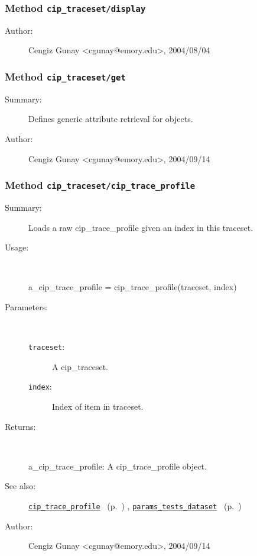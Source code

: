 \subsubsection[Method \texttt{display}]{Method \texttt{cip\_traceset/display}}%
%
\label{ref_cip_traceset__display}%
\hypertarget{ref_cip_traceset__display}{}%
\begin{description}
%
%
%
%
%
%
%
\item[Author:]%
Cengiz Gunay <cgunay@emory.edu>, 2004/08/04%
\end{description}
\methodline%
\subsubsection[Method \texttt{get}]{Method \texttt{cip\_traceset/get}}%
%
\label{ref_cip_traceset__get}%
\hypertarget{ref_cip_traceset__get}{}%
\begin{description}
\item[Summary:]Defines generic attribute retrieval for objects.
%
%
%
%
%
%
%
\item[Author:]%
Cengiz Gunay <cgunay@emory.edu>, 2004/09/14%
\end{description}
\methodline%
\subsubsection[Method \texttt{cip\_trace\_profile}]{Method \texttt{cip\_traceset/cip\_trace\_profile}}%
%
\label{ref_cip_traceset__cip_trace_profile}%
\hypertarget{ref_cip_traceset__cip_trace_profile}{}%
\begin{description}
\item[Summary:]Loads a raw cip\_trace\_profile given an index in this traceset.
%
\item[Usage:]~%
\begin{lyxcode}%
a\_cip\_trace\_profile = cip\_trace\_profile(traceset, index)
%
\end{lyxcode}%
%
%
\item[Parameters:]~
\begin{description}%
\item[\texttt{traceset}:]
 A cip\_traceset.
\item[\texttt{index}:]
 Index of item in traceset.
\end{description}%
%
\item[Returns:]~

	a\_cip\_trace\_profile: A cip\_trace\_profile object.
%
%
\item[See also:]%
\hyperlink{ref_cip_trace_profile}{\texttt{cip\_trace\_profile}}%
\ (p.~\pageref{ref_cip_trace_profile})%
%
, \hyperlink{ref_params_tests_dataset}{\texttt{params\_tests\_dataset}}%
\ (p.~\pageref{ref_params_tests_dataset})%
%
%
\item[Author:]%
Cengiz Gunay <cgunay@emory.edu>, 2004/09/14%
\end{description}
\methodline%
